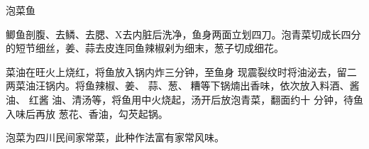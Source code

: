 \begin{recipe}{泡菜鱼}

\ingredients


\preparation

\step 鲫鱼剖腹、去鳞、去腮、X去内脏后洗净，鱼身两面立划四刀。泡青菜切成长四分
的短节细丝，姜、蒜去皮连同鱼辣椒剁为细末，葱子切成细花。

\step 菜油在旺火上烧红，将鱼放入锅内炸三分钟，至鱼身 现震裂纹时将油泌去，留二
两菜油汪锅内。将鱼辣椒、姜、 蒜、葱、𫃑糟等下锅煵出香味，依次放入料酒、酱油、
红酱 油、清汤等，将鱼用中火烧起，汤开后放泡青菜，翻面约十 分钟，待鱼入味后再放
葱花、香油，勾芡起锅。

\features

泡菜为四川民间家常菜，此种作法富有家常风味。

\end{recipe}

